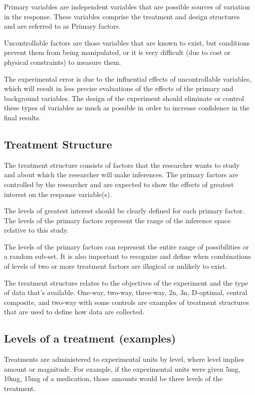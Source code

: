 \documentclass[a4paper,12pt]{article}
\begin{document}
Primary variables are independent variables that are possible sources of variation in the response. These variables comprise the treatment and design structures and are referred to as Primary factors.

Uncontrollable factors are those variables that are known to exist, but
conditions prevent them from being manipulated, or it is very difficult (due to cost or physical constraints) to measure them.


The experimental error is due to the influential effects of uncontrollable variables, which will result in less precise evaluations of the effects of the primary and background variables. The design of the experiment should eliminate or control these types of variables as much as possible in order to increase confidence in the final results.


\subsection{Treatment Structure}
The treatment structure consists of factors that the researcher wants to study and about which the researcher will make inferences. The primary factors are controlled by the researcher and are expected to show the effects of greatest interest on the response variable(s). 

The levels of greatest interest should be clearly defined for each primary factor. The levels of the primary factors represent the range of the inference space relative to this study. 

The levels of the primary factors can represent the entire range of possibilities or a random sub-set. It is also important to recognize and define when combinations of levels of two or more treatment factors are illogical or unlikely to exist.

The treatment structure relates to the objectives of the experiment and the type of data that’s available. One-way, two-way, three-way, 2n, 3n, D-optimal, central composite, and two-way with some controls are examples of treatment structures that are used to define how
data are collected. 

\subsection{Levels of a treatment (examples)}
Treatments are administered to experimental units by level, where level implies amount or magnitude. For example, if the experimental units were given 5mg, 10mg, 15mg of a medication, those amounts would be three levels of the treatment. 
\end{document}

